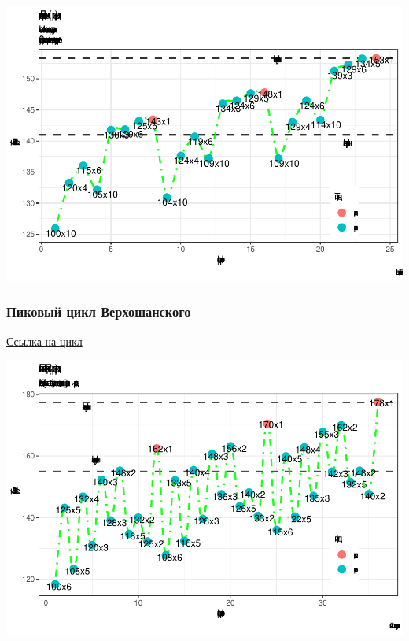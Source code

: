 \documentclass[
]{article}
\begin{document}
\begin{center}\includegraphics[width=0.95\linewidth]{Regression-model-for-estimating-RM_files/figure-latex/unnamed-chunk-57-2} \end{center}

\hypertarget{ux43fux438ux43aux43eux432ux44bux439-ux446ux438ux43aux43b-ux432ux435ux440ux445ux43eux448ux430ux43dux441ux43aux43eux433ux43e}{%
\subsubsection{Пиковый цикл
Верхошанского}\label{ux43fux438ux43aux43eux432ux44bux439-ux446ux438ux43aux43b-ux432ux435ux440ux445ux43eux448ux430ux43dux441ux43aux43eux433ux43e}}

\href{https://github.com/PasaOpasen/Powerlifting-training-diary-and-articles/blob/master/Материалы\%20по\%20пауэрлифтингу\%20и\%20не\%20только/циклы/Пиковый\%20цикл\%20Верхошанского.xls}{Ссылка
на цикл}

\begin{center}\includegraphics[width=0.95\linewidth]{Regression-model-for-estimating-RM_files/figure-latex/unnamed-chunk-58-1} \end{center}
\end{document}
